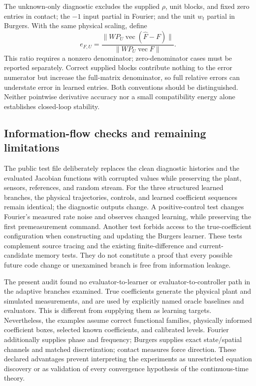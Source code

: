 The unknown-only diagnostic excludes the supplied $\rho$, unit blocks,
and fixed zero entries in contact; the $-1$ input partial in Fourier;
and the unit $w_t$ partial in Burgers. With the same physical scaling,
define
\begin{equation}
 e_{F,U}=\frac{\|WP_U\operatorname{vec}(\widehat F-F)\|}
 {\|WP_U\operatorname{vec}F\|}.
 \label{eq:audit_unknown_only}
\end{equation}
This ratio requires a nonzero denominator; zero-denominator cases must
be reported separately. Correct supplied blocks contribute nothing to
the error numerator but increase the full-matrix denominator, so full
relative errors can understate error in learned entries. Both conventions
should be distinguished. Neither pointwise derivative accuracy nor a
small compatibility energy alone establishes closed-loop stability.

\subsection{Information-flow checks and remaining limitations}
The public test file 
deliberately replaces the clean diagnostic histories and the evaluated
Jacobian functions with corrupted values while preserving the plant,
sensors, references, and random stream. For the three structured learned branches,
the physical trajectories, controls, and learned coefficient sequences
remain identical; the diagnostic outputs change. A positive-control test
changes Fourier's measured rate noise and observes changed learning,
while preserving the first premeasurement command. Another test forbids
access to the true-coefficient configuration when constructing and
updating the Burgers learner. These tests complement source tracing and
the existing finite-difference and current-candidate memory tests. They
do not constitute a proof that every possible future code change or
unexamined branch is free from information leakage.

The present audit found no evaluator-to-learner or evaluator-to-controller
path in the adaptive branches examined. True coefficients generate the
physical plant and simulated measurements, and are used by explicitly
named oracle baselines and evaluators. This is different from supplying
them as learning targets. Nevertheless, the examples assume correct
functional families, physically informed coefficient boxes, selected
known coefficients, and calibrated levels. Fourier additionally supplies
phase and frequency; Burgers supplies exact state/spatial channels and
matched discretization; contact measures force direction. These declared
advantages prevent interpreting the experiments as unrestricted equation
discovery or as validation of every convergence hypothesis of the
continuous-time theory.
